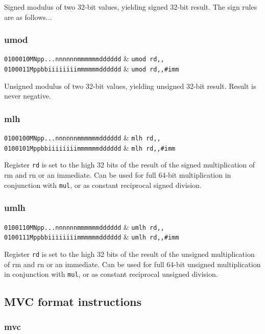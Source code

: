 Signed modulus of two 32-bit values, yielding signed 32-bit result. The sign rules are as follows...

\subsubsection{umod}

\decfmt
\texttt{0100010MNpp...nnnnnnmmmmmmdddddd} & \texttt{umod rd,,} \\
\texttt{0100011Mppbbiiiiiiiimmmmmmdddddd} & \texttt{umod rd,,\#imm}
\finfmt

Unsigned modulus of two 32-bit values, yielding unsigned 32-bit result. Result is never negative.

\subsubsection{mlh}

\decfmt
\texttt{0100100MNpp...nnnnnnmmmmmmdddddd} & \texttt{mlh rd,,} \\
\texttt{0100101Mppbbiiiiiiiimmmmmmdddddd} & \texttt{mlh rd,,\#imm}
\finfmt

Register \texttt{rd} is set to the high 32 bits of the result of the signed multiplication of rm and rn or an immediate. Can be used for full 64-bit multiplication in conjunction with \texttt{mul}, or as constant reciprocal signed division.

\subsubsection{umlh}

\decfmt
\texttt{0100110MNpp...nnnnnnmmmmmmdddddd} & \texttt{umlh rd,,} \\
\texttt{0100111Mppbbiiiiiiiimmmmmmdddddd} & \texttt{umlh rd,,\#imm}
\finfmt

Register \texttt{rd} is set to the high 32 bits of the result of the unsigned multiplication of rm and rn or an immediate. Can be used for full 64-bit unsigned multiplication in conjunction with \texttt{mul}, or as constant reciprocal unsigned division.

\subsection{MVC format instructions}

\subsubsection{mvc}

